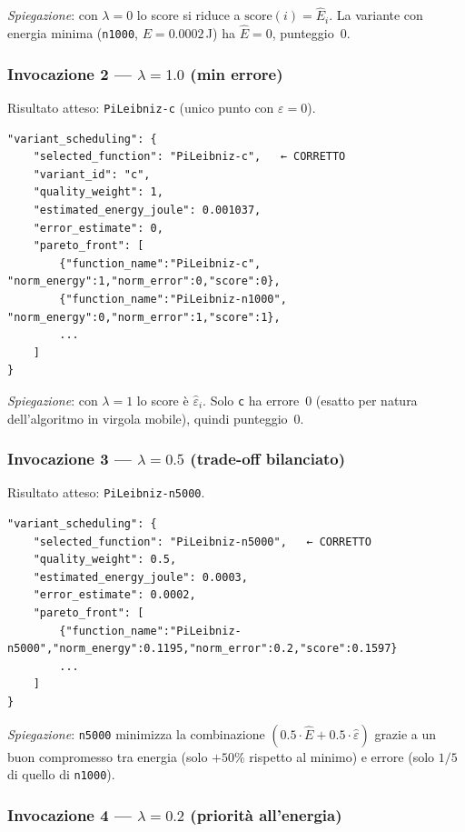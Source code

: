\documentclass[a4paper,12pt]{article}
\begin{document}
\textit{Spiegazione}: con $\lambda=0$ lo score si riduce a
$\text{score}(i) = \hat{E}_i$.  La variante con energia minima
(\texttt{n1000}, $E=0.0002$\,J) ha $\hat{E}=0$, punteggio~0.

\subsubsection{Invocazione 2 --- $\lambda = 1.0$ (min errore)}

Risultato atteso: \texttt{PiLeibniz-c} (unico punto con $\varepsilon=0$).

\begin{lstlisting}[style=json]
"variant_scheduling": {
    "selected_function": "PiLeibniz-c",   ← CORRETTO
    "variant_id": "c",
    "quality_weight": 1,
    "estimated_energy_joule": 0.001037,
    "error_estimate": 0,
    "pareto_front": [
        {"function_name":"PiLeibniz-c",     "norm_energy":1,"norm_error":0,"score":0},
        {"function_name":"PiLeibniz-n1000", "norm_energy":0,"norm_error":1,"score":1},
        ...
    ]
}
\end{lstlisting}

\textit{Spiegazione}: con $\lambda=1$ lo score è $\hat{\varepsilon}_i$.
Solo \texttt{c} ha errore~0 (esatto per natura dell'algoritmo
in virgola mobile), quindi punteggio~0.

\subsubsection{Invocazione 3 --- $\lambda = 0.5$ (trade-off bilanciato)}

Risultato atteso: \texttt{PiLeibniz-n5000}.

\begin{lstlisting}[style=json]
"variant_scheduling": {
    "selected_function": "PiLeibniz-n5000",   ← CORRETTO
    "quality_weight": 0.5,
    "estimated_energy_joule": 0.0003,
    "error_estimate": 0.0002,
    "pareto_front": [
        {"function_name":"PiLeibniz-n5000","norm_energy":0.1195,"norm_error":0.2,"score":0.1597}
        ...
    ]
}
\end{lstlisting}

\textit{Spiegazione}: \texttt{n5000} minimizza la combinazione
$(0.5 \cdot \hat{E} + 0.5 \cdot \hat{\varepsilon})$ grazie a un
buon compromesso tra energia (solo $+50\%$ rispetto al minimo) e
errore (solo $1/5$ di quello di \texttt{n1000}).

\subsubsection{Invocazione 4 --- $\lambda = 0.2$ (priorità all'energia)}
\end{document}
